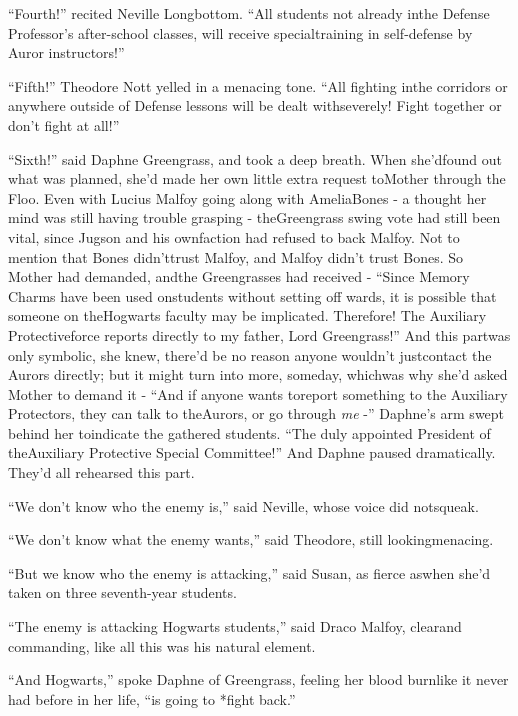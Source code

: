 ``Fourth!'' recited Neville Longbottom. ``All students not already inthe Defense Professor's after-school classes, will receive specialtraining in self-defense by Auror instructors!''

``Fifth!'' Theodore Nott yelled in a menacing tone. ``All fighting inthe corridors or anywhere outside of Defense lessons will be dealt withseverely! Fight together or don't fight at all!''

``Sixth!'' said Daphne Greengrass, and took a deep breath. When she'dfound out what was planned, she'd made her own little extra request toMother through the Floo. Even with Lucius Malfoy going along with AmeliaBones - a thought her mind was still having trouble grasping - theGreengrass swing vote had still been vital, since Jugson and his ownfaction had refused to back Malfoy. Not to mention that Bones didn'ttrust Malfoy, and Malfoy didn't trust Bones. So Mother had demanded, andthe Greengrasses had received - ``Since Memory Charms have been used onstudents without setting off wards, it is possible that someone on theHogwarts faculty may be implicated. Therefore! The Auxiliary Protectiveforce reports directly to my father, Lord Greengrass!'' And this partwas only symbolic, she knew, there'd be no reason anyone wouldn't justcontact the Aurors directly; but it might turn into more, someday, whichwas why she'd asked Mother to demand it - ``And if anyone wants toreport something to the Auxiliary Protectors, they can talk to theAurors, or go through \emph{me} -'' Daphne's arm swept behind her toindicate the gathered students. ``The duly appointed President of theAuxiliary Protective Special Committee!''
And Daphne paused dramatically. They'd all rehearsed this part.

``We don't know who the enemy is,'' said Neville, whose voice did notsqueak.

``We don't know what the enemy wants,'' said Theodore, still lookingmenacing.

``But we know who the enemy is attacking,'' said Susan, as fierce aswhen she'd taken on three seventh-year students.

``The enemy is attacking Hogwarts students,'' said Draco Malfoy, clearand commanding, like all this was his natural element.

``And Hogwarts,'' spoke Daphne of Greengrass, feeling her blood burnlike it never had before in her life, ``is going to *fight back.''